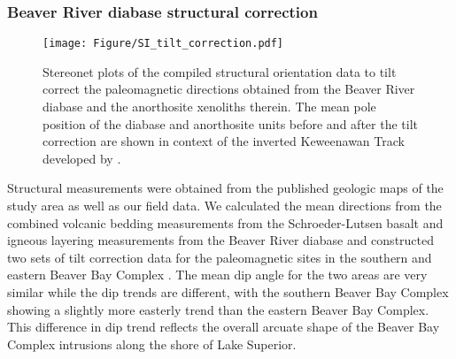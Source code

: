 \documentclass[11pt,letterpaper]{article}
\begin{document}

\subsubsection*{Beaver River diabase structural correction}

\begin{figure}[h!]
\noindent\texttt{[image: Figure/SI\_tilt\_correction.pdf]}
\centering
\caption{\footnotesize{Stereonet plots of the compiled structural orientation data to tilt correct the paleomagnetic directions obtained from the Beaver River diabase and the anorthosite xenoliths therein. The mean pole position of the diabase and anorthosite units before and after the tilt correction are shown in context of the inverted Keweenawan Track developed by \cite{Swanson-Hysell2019a}.}}
\label{fig:tilt_correction}
\end{figure}

Structural measurements were obtained from the published geologic maps of the study area as well as our field data. We calculated the mean directions from the combined volcanic bedding measurements from the Schroeder-Lutsen basalt and igneous layering measurements from the Beaver River diabase and constructed two sets of tilt correction data for the paleomagnetic sites in the southern and eastern Beaver Bay Complex \citep{Boerboom2004a, Boerboom2006a, Boerboom2006b, Boerboom2007a, Miller2001a}. The mean dip angle for the two areas are very similar while the dip trends are different, with the southern Beaver Bay Complex showing a slightly more easterly trend than the eastern Beaver Bay Complex. This difference in dip trend reflects the overall arcuate shape of the Beaver Bay Complex intrusions along the shore of Lake Superior. 
\end{document}
